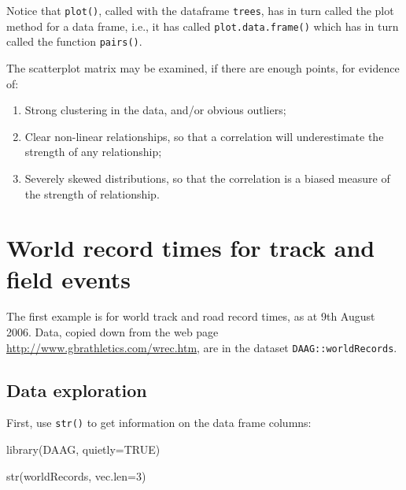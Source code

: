 \documentclass{tufte-book}\usepackage[]{graphicx}\usepackage[]{color}
\newcommand{\txtt}[1]{\texttt{#1}}
\begin{document}
Notice that \txtt{plot()}, called with the dataframe \txtt{trees},
has in turn called the plot method for a data frame, i.e.,
it has called \txtt{plot.data.frame()} which has in turn called
the function \txtt{pairs()}.

The scatterplot matrix may be examined, if there are enough
points, for evidence of:
\begin{enumerate}
\item Strong clustering in the data, and/or
obvious outliers;
\item Clear non-linear relationships, so that a
correlation will underestimate the strength of any relationship;
\item Severely skewed distributions, so that the correlation is a biased
measure of the strength of relationship.
\end{enumerate}

\section{World record times for track and field events}\label{sec:wr}

The first example is for world track and road record times,
 as at 9th August 2006.  Data,
copied down from the web page
\url{http://www.gbrathletics.com/wrec.htm}, are in the dataset
\txtt{DAAG::worldRecords}.

\subsection*{Data exploration}
First, use \txtt{str()} to get information on the data frame columns:

\begin{Schunk}
\begin{Sinput}
library(DAAG, quietly=TRUE)
\end{Sinput}
\end{Schunk}

\begin{fullwidth}
\begin{Schunk}
\begin{Sinput}
str(worldRecords, vec.len=3)
\end{Sinput}
\end{Schunk}
\end{fullwidth}
\end{document}

